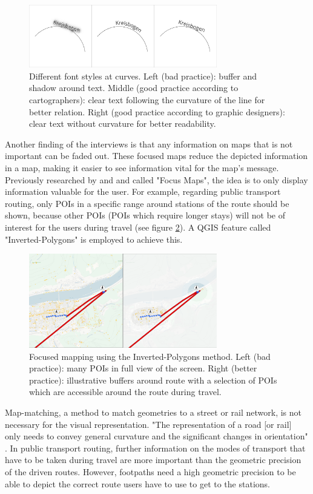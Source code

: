 \documentclass[agile, final]{copernicus-agile}
\begin{document}
\begin{figure}[ht]
  \includegraphics[width=8.2cm]{figures/schrift.png}
\caption{Different font styles at curves. Left (bad practice): buffer and shadow around text. Middle (good practice according to cartographers): clear text following the curvature of the line for better relation. Right (good practice according to graphic designers): clear text without curvature for better readability.}
\label{fig:schrift}
\end{figure}

Another finding of the interviews is that any information on maps that is not important can be faded out. These focused maps reduce the depicted information in a map, making it easier to see information vital for the map's message. Previously researched by \citet{ZipfNeis2007} and \citet{ZipfRichter2002} and called "Focus Maps", the idea is to only display information valuable for the user. For example, regarding public transport routing, only POIs in a specific range around stations of the route should be shown, because other POIs (POIs which require longer stays) will not be of interest for the users during travel (see figure \ref{fig:linien_buffer_klein}). A QGIS feature called "Inverted-Polygons" is employed to achieve this.

\begin{figure}[ht]
  \includegraphics[width=8.2cm]{figures/linien_buffer_klein.png}
\caption{Focused mapping using the Inverted-Polygons method. Left (bad practice): many POIs in full view of the screen. Right (better practice): illustrative buffers around route with a selection of POIs which are accessible around the route during travel.}
\label{fig:linien_buffer_klein}
\end{figure}

Map-matching, a method to match geometries to a street or rail network, is not necessary for the visual representation. "The representation of a road [or rail] only needs to convey general curvature and the significant changes in orientation" \citep{AgrawalaStolte2000}. In public transport routing, further information on the modes of transport that have to be taken during travel are more important than the geometric precision of the driven routes. However, footpaths need a high geometric precision to be able to depict the correct route users have to use to get to the stations.
\end{document}
